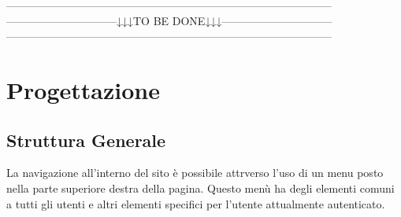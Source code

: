 -----------------------------------------------------------------------------------------\\
------------------------------↓↓↓TO BE DONE↓↓↓------------------------------\\
-----------------------------------------------------------------------------------------
\section{Progettazione}
\subsection{Struttura Generale}
La navigazione all'interno del sito è possibile attrverso l'uso di un menu posto nella parte superiore destra della pagina. Questo menù ha degli elementi comuni a tutti gli utenti e altri elementi specifici per l'utente attualmente autenticato.
